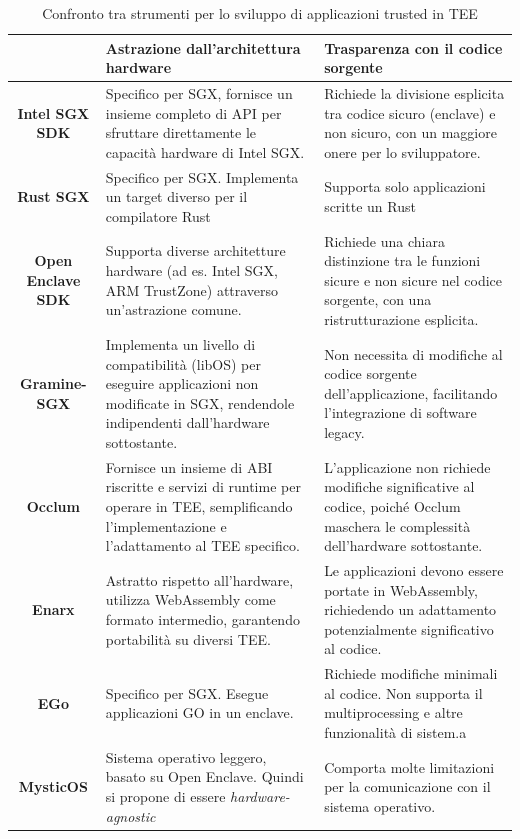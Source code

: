 \documentclass{article}
\begin{document}
\begin{table}[h]
\centering
\begin{tabular}{|c|p{6cm}|p{6cm}|}
\hline
      & \textbf{Astrazione dall'architettura hardware} & \textbf{Trasparenza con il codice sorgente} \\ \hline
\textbf{Intel SGX SDK}  & Specifico per SGX, fornisce un insieme completo di API per sfruttare direttamente le capacità hardware di Intel SGX. & Richiede la divisione esplicita tra codice sicuro (enclave) e non sicuro, con un maggiore onere per lo sviluppatore. \\ \hline
\textbf{Rust SGX} & Specifico per SGX. Implementa un target diverso per il compilatore Rust & Supporta solo applicazioni scritte un Rust \\ \hline
\textbf{Open Enclave SDK} & Supporta diverse architetture hardware (ad es. Intel SGX, ARM TrustZone) attraverso un'astrazione comune. & Richiede una chiara distinzione tra le funzioni sicure e non sicure nel codice sorgente, con una ristrutturazione esplicita. \\ \hline
\textbf{Gramine-SGX}   & Implementa un livello di compatibilità (libOS) per eseguire applicazioni non modificate in SGX, rendendole indipendenti dall'hardware sottostante. & Non necessita di modifiche al codice sorgente dell'applicazione, facilitando l'integrazione di software legacy. \\ \hline
\textbf{Occlum}         & Fornisce un insieme di ABI riscritte e servizi di runtime per operare in TEE, semplificando l'implementazione e l'adattamento al TEE specifico. & L'applicazione non richiede modifiche significative al codice, poiché Occlum maschera le complessità dell'hardware sottostante. \\ \hline
\textbf{Enarx}          & Astratto rispetto all'hardware, utilizza WebAssembly come formato intermedio, garantendo portabilità su diversi TEE. & Le applicazioni devono essere portate in WebAssembly, richiedendo un adattamento potenzialmente significativo al codice. \\ \hline
\textbf{EGo} & Specifico per SGX. Esegue applicazioni GO in un enclave. & Richiede modifiche minimali al codice. Non supporta il multiprocessing e altre funzionalità di sistem.a \\ \hline
\textbf{MysticOS} & Sistema operativo leggero, basato su Open Enclave. Quindi si propone di essere \textit{hardware-agnostic} & Comporta molte limitazioni per la comunicazione con il sistema operativo. \\ \hline
\end{tabular}
\caption{Confronto tra strumenti per lo sviluppo di applicazioni trusted in TEE}
\label{tab:TEE_tools_comparison}
\end{table}
\end{document}
